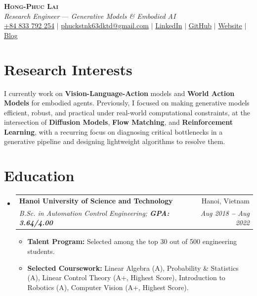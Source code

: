 \documentclass[letterpaper,11pt]{article}
\makeatletter
\newcommand{\resumeSubheading}[4]{
  \vspace{-2pt}\item
    \begin{tabular*}{0.97\textwidth}[t]{l@{\extracolsep{\fill}}r}
      \textbf{#1} & #2 \\
      \textit{\small#3} & \textit{\small #4} \\
    \end{tabular*}\vspace{-7pt}
}
\newcommand{\resumeSubHeadingListStart}{\begin{itemize}[leftmargin=0.15in, label={}]}
\newcommand{\resumeSubHeadingListEnd}{\end{itemize}}
\newcommand{\resumeItemListStart}{\begin{itemize}}
\newcommand{\resumeItemListEnd}{\end{itemize}\vspace{-5pt}}
\makeatother
\begin{document}

\begin{center}
    \textbf{\Huge \scshape Hong-Phuc Lai} \\ \vspace{3pt}
    \textit{Research Engineer} --- \textit{Generative Models \& Embodied AI} \\ \vspace{3pt}
    \small
    \faMobile \hspace{.5pt} \href{tel:84833792254}{+84 833 792 254}
    $|$
    \faAt \hspace{.5pt} \href{mailto:phuckstnk63dktd@gmail.com}{phuckstnk63dktd@gmail.com}
    $|$
    \faLinkedinSquare \hspace{.5pt} \href{https://www.linkedin.com/in/plai-3ffct2cb/}{LinkedIn}
    $|$
    \faGithub \hspace{.5pt} \href{https://github.com/laihongphuc}{GitHub}
    $|$
    \faGlobe \hspace{.5pt} \href{https://laihongphuc.github.io/}{Website}
    $|$
    \faPencil \hspace{.5pt} \href{https://laihongphuc.github.io/blog/}{Blog}
\end{center}

\section{Research Interests}
\vspace{3pt}
I currently work on \textbf{Vision-Language-Action} models and \textbf{World Action Models} for embodied agents. Previously, I focused on making generative models efficient, robust, and practical under real-world computational constraints, at the intersection of \textbf{Diffusion Models}, \textbf{Flow Matching}, and \textbf{Reinforcement Learning}, with a recurring focus on diagnosing critical bottlenecks in a generative pipeline and designing lightweight algorithms to resolve them. \\



\section{Education}
\vspace{3pt}
\resumeSubHeadingListStart
    \resumeSubheading
      {Hanoi University of Science and Technology}{Hanoi, Vietnam}
      {B.Sc. in Automation Control Engineering; \textbf{GPA: 3.64/4.00}}{Aug 2018 \textbf{--} Aug 2022}
    \small{\resumeItemListStart
    \item{\textbf{Talent Program:} Selected among the top 30 out of 500 engineering students.}
    \item{\textbf{Selected Coursework:} Linear Algebra (A), Probability \& Statistics (A), Linear Control Theory (A+, Highest Score), Introduction to Robotics (A), Computer Vision (A+, Highest Score).}
    \resumeItemListEnd}
\resumeSubHeadingListEnd
\end{document}
